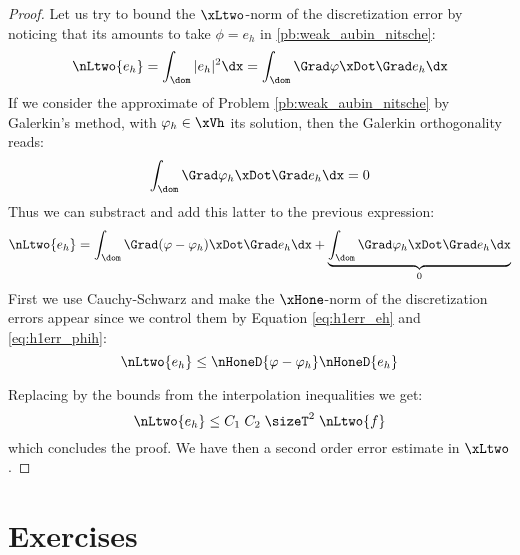 \begin{proof}
\medskip
Let us try to bound the $\xLtwo$-norm of the discretization error by noticing that its amounts to take $\phi = e_h$ in \eqref{pb:weak_aubin_nitsche}:
\begin{equation*}
\nLtwo{e_h} = \int_\dom |e_h|^2 \dx = \int_\dom \Grad \varphi\xDot \Grad e_h\dx
\end{equation*}
If we consider the approximate of Problem \eqref{pb:weak_aubin_nitsche} by Galerkin's method, with $\varphi_h \in \xVh$ its solution, then the Galerkin orthogonality reads:
\begin{equation*}
\int_\dom \Grad \varphi_h\xDot \Grad e_h\dx  = 0
\end{equation*}
Thus we can substract and add this latter to the previous expression:
\begin{equation*}
\nLtwo{e_h} = \int_\dom \Grad (\varphi - \varphi_h)\xDot \Grad e_h\dx + \underbrace{\int_\dom \Grad \varphi_h\xDot \Grad e_h\dx}_{0}
\end{equation*}
First we use Cauchy-Schwarz and make the $\xHone$-norm of the discretization errors appear since we control them by Equation \eqref{eq:h1err_eh} and \eqref{eq:h1err_phih}:
\begin{equation*}
\nLtwo{e_h} \leq \nHoneD{\varphi - \varphi_h} \nHoneD{e_h}
\end{equation*}

\medskip
Replacing by the bounds from the interpolation inequalities we get:
\begin{equation*}
\nLtwo{e_h} \leq C_1\;C_2\;\sizeT^2\;\nLtwo{f}
\end{equation*}
which concludes the proof. We have then a second order error estimate in $\xLtwo$.
\end{proof}

\section{Exercises}


